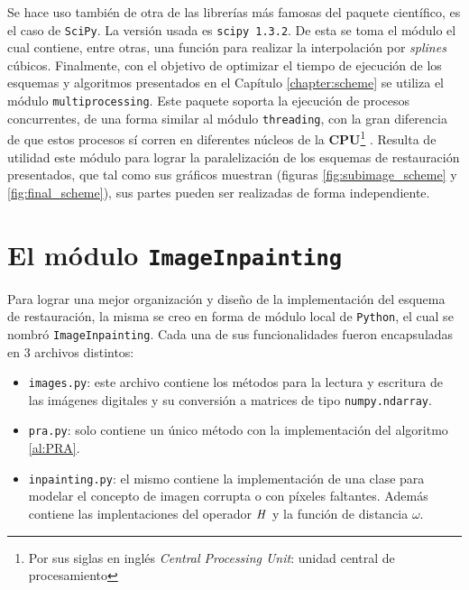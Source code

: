Se hace uso tambi\'en de otra de las librer\'ias m\'as famosas del paquete científico, es el caso de \texttt{SciPy}. La versión usada es \texttt{scipy 1.3.2}. De esta se toma el m\'odulo  el cual contiene, entre otras, una funci\'on para realizar la interpolaci\'on por \textit{splines} c\'ubicos. Finalmente, con el objetivo de optimizar el tiempo de ejecuci\'on de los esquemas y algoritmos presentados en el Cap\'itulo \ref{chapter:scheme} se utiliza el m\'odulo \texttt{multiprocessing}. Este paquete soporta la ejecuci\'on de procesos concurrentes, de una forma similar al m\'odulo \texttt{threading}, con la gran diferencia de que estos procesos s\'i corren en diferentes n\'ucleos de la \textbf{CPU}\footnote{Por sus siglas en ingl\'es \textit{Central Processing Unit}: unidad central de procesamiento} \cite{enwiki:cpu}. Resulta de utilidad este m\'odulo para lograr la paralelizaci\'on de los esquemas de restauraci\'on presentados, que tal como sus gr\'aficos muestran (figuras \ref{fig:subimage_scheme} y \ref{fig:final_scheme}), sus partes pueden ser realizadas de forma independiente.

\section{El m\'odulo \texttt{ImageInpainting}}

Para lograr una mejor organizaci\'on y diseño de la implementaci\'on del esquema de restauraci\'on, la misma se creo en forma de m\'odulo local de \texttt{Python}, el cual se nombr\'o \texttt{ImageInpainting}. Cada una de sus funcionalidades fueron encapsuladas en 3 archivos distintos:
\begin{itemize}
	\item \texttt{images.py}: este archivo contiene los m\'etodos para la lectura y escritura de las im\'agenes digitales y su conversi\'on a matrices de tipo \texttt{numpy.ndarray}.
	\item \texttt{pra.py}: solo contiene un \'unico m\'etodo con la implementaci\'on del algoritmo \ref{al:PRA}.
	\item \texttt{inpainting.py}: el mismo contiene la implementaci\'on de una clase para modelar el concepto de imagen corrupta o con p\'ixeles faltantes. Adem\'as contiene las implentaciones del operador $\mathit{H}$ y la funci\'on de distancia $\omega$. 
\end{itemize}

